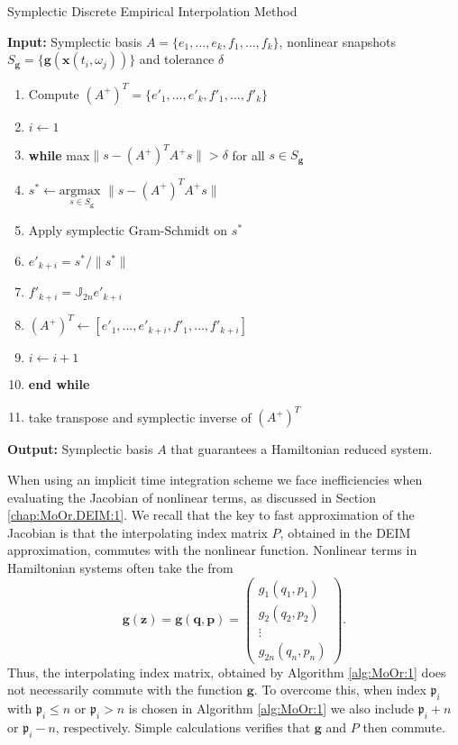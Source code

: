 \documentclass[final]{siamart}
\begin{document}
\begin{algorithm} 
\caption{Symplectic Discrete Empirical Interpolation Method} \label{alg:SyMo:4}
{\bf Input:} Symplectic basis $A=\{ e_1,\dots,e_k,f_1,\dots,f_k \}$, nonlinear snapshots $S_{\mathbf g} = \{ \mathbf g(\mathbf x(t_i,\omega_j)) \}$ and tolerance $\delta$
\begin{enumerate}
\item Compute $(A^+)^T = \{ e'_1,\dots,e'_k,f'_1,\dots,f'_k \}$
\item $i \leftarrow 1$
\item \textbf{while} max$\| s - (A^+)^T A^+s \| > \delta$ for all $s\in S_{\mathbf g}$
\item \hspace{0.5cm} $s^* \leftarrow \underset{s \in S_{\mathbf g}}{\text{argmax }}\| s - (A^+)^T A^+ s \|$
\item \hspace{0.5cm} Apply symplectic Gram-Schmidt on $s^*$
\item \hspace{0.5cm} $e'_{k+i} = s^* / \| s^* \|$
\item \hspace{0.5cm} $f'_{k+i} = \mathbb J_{2n} e'_{k+i}$
\item \hspace{0.5cm} $(A^+)^T \leftarrow [e'_1,\dots,e'_{k+i},f'_1,\dots,f'_{k+i}]$
\item \hspace{0.5cm} $i\leftarrow i+1$
\item \textbf{end while}
\item take transpose and symplectic inverse of $(A^+)^T$
\end{enumerate}
\vspace{0.5cm}
{\bf Output:} Symplectic basis $A$ that guarantees a Hamiltonian reduced system.
\end{algorithm}

When using an implicit time integration scheme we face inefficiencies when evaluating the Jacobian of nonlinear terms, as discussed in Section \ref{chap:MoOr.DEIM:1}. We recall that the key to fast approximation of the Jacobian is that the interpolating index matrix $P$, obtained in the DEIM approximation, commutes with the nonlinear function. Nonlinear terms in Hamiltonian systems often take the from
\begin{equation}
	\mathbf g (\mathbf z) = \mathbf g (\mathbf q,\mathbf p) = 
	\begin{pmatrix}
		g_1(q_1,p_1) \\
		g_2(q_2,p_2) \\
		\vdots \\
		g_{2n}(q_{n},p_{n})
	\end{pmatrix}.
\end{equation}
Thus, the interpolating index matrix, obtained by Algorithm \ref{alg:MoOr:1} does not necessarily commute with the function $\mathbf g$. To overcome this, when index $\mathfrak p_i$ with $\mathfrak p_i\leq n$ or $\mathfrak p_i>n$ is chosen in Algorithm \ref{alg:MoOr:1} we also include $\mathfrak p_i + n$ or $\mathfrak p_i-n$, respectively. {{\color{black}} Simple calculations verifies that $\mathbf g$ and $P$ then commute.}
\end{document}

